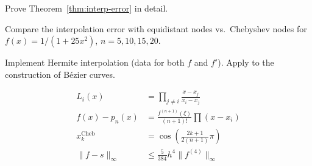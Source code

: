 \begin{exercise}[$\star\star$]
Prove Theorem~\ref{thm:interp-error} in detail.
\end{exercise}

\begin{exercise}[$\star\star$]
Compare the interpolation error with equidistant nodes vs.\ Chebyshev nodes for $f(x)=1/(1+25x^2)$, $n=5,10,15,20$.
\end{exercise}

\begin{exercise}
Implement Hermite interpolation (data for both $f$ and $f'$). Apply to the construction of B\'ezier curves.
\end{exercise}

\begin{keyformulas}
\begin{align*}
L_i(x) &= \prod_{j\neq i}\frac{x-x_j}{x_i-x_j} \\
f(x)-p_n(x) &= \frac{f^{(n+1)}(\xi)}{(n+1)!}\prod(x-x_i) \\
x_k^{\text{Cheb}} &= \cos\!\left(\frac{2k+1}{2(n+1)}\pi\right) \\
\|f-s\|_\infty &\leq \frac{5}{384}h^4\|f^{(4)}\|_\infty
\end{align*}
\end{keyformulas}
